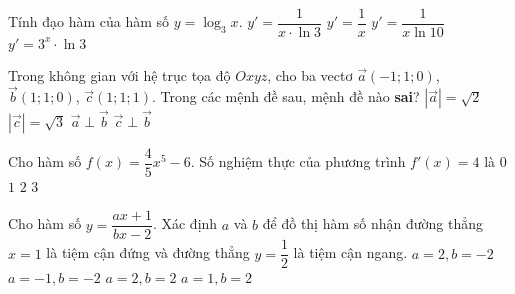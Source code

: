 \begin{ex}%
	Tính đạo hàm của hàm số $y=\log_3x$.
	\choice
	{\True $y'=\dfrac{1}{x\cdot \ln 3}$}
	{$y'=\dfrac{1}{x}$}
	{$y'=\dfrac{1}{x\ln 10}$}
	{$y'=3^x\cdot \ln 3$}
\end{ex}
\begin{ex}%
	Trong không gian với hệ trục tọa độ $Oxyz$, cho ba vectơ $\vec{a}\left(-1;1;0\right)$, $\vec{b}\left(1;1;0\right)$, $\vec{c}\left(1;1;1\right)$. Trong các mệnh đề sau, mệnh đề nào \textbf{sai}?
	\choice
	{$\left|\vec{a}\right|=\sqrt{2}$}
	{$\left|\vec{c}\right|=\sqrt{3}$}
	{$\vec{a}\perp \vec{b}$}
	{\True $\vec{c}\perp \vec{b}$}
\end{ex}
\begin{ex}%
	Cho hàm số $f(x)=\dfrac{4}{5}x^5-6$. Số nghiệm thực của phương trình $f'(x)=4$ là
	\choice
	{$0$}
	{$1$}
	{\True $2$}
	{$3$}
\end{ex}


\begin{ex}%
	Cho hàm số $y=\dfrac{ax+1}{bx-2}$. Xác định $a$ và $b$ để đồ thị hàm số nhận đường thẳng $x=1$ là tiệm cận đứng và đường thẳng $y=\dfrac{1}{2}$ là tiệm cận ngang.
	\choice
	{$a=2,b=-2$}
	{$a=-1,b=-2$}
	{$a=2,b=2$}
	{\True $a=1,b=2$}
\end{ex}

